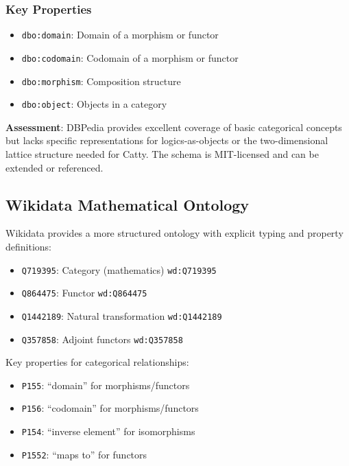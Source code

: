 \subsubsection{Key Properties}

\begin{itemize}
  \item \texttt{dbo:domain}: Domain of a morphism or functor
  \item \texttt{dbo:codomain}: Codomain of a morphism or functor
  \item \texttt{dbo:morphism}: Composition structure
  \item \texttt{dbo:object}: Objects in a category
\end{itemize}

\textbf{Assessment}: DBPedia provides excellent coverage of basic categorical concepts but lacks specific representations for logics-as-objects or the two-dimensional lattice structure needed for Catty. The schema is MIT-licensed and can be extended or referenced.

\subsection{Wikidata Mathematical Ontology}

Wikidata provides a more structured ontology with explicit typing and property definitions:

\begin{itemize}
  \item \texttt{Q719395}: Category (mathematics) \texttt{wd:Q719395}
  \item \texttt{Q864475}: Functor \texttt{wd:Q864475}
  \item \texttt{Q1442189}: Natural transformation \texttt{wd:Q1442189}
  \item \texttt{Q357858}: Adjoint functors \texttt{wd:Q357858}
\end{itemize}

Key properties for categorical relationships:
\begin{itemize}
  \item \texttt{P155}: ``domain'' for morphisms/functors
  \item \texttt{P156}: ``codomain'' for morphisms/functors
  \item \texttt{P154}: ``inverse element'' for isomorphisms
  \item \texttt{P1552}: ``maps to'' for functors
\end{itemize}

